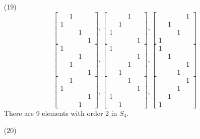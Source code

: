 \documentclass[12pt]{article}
\begin{document}
\begin{itemize}
\begin{itemize}
\end{itemize}
\item[(19)]
$$\begin{bmatrix}
& 1 \\
1 & \\
& & 1 \\
& & & 1
\end{bmatrix}, \begin{bmatrix}
& & 1 \\
& 1 \\
1 \\
& & & 1
\end{bmatrix}, \begin{bmatrix}
& & & 1 \\
& 1 \\
& & 1 \\
1
\end{bmatrix}$$
$$\begin{bmatrix}
1 \\
& & 1 \\
& 1 \\
& & & 1
\end{bmatrix}, \begin{bmatrix}
1 \\
& & & 1 \\
& & 1 \\
& 1
\end{bmatrix}, \begin{bmatrix}
1 \\
& 1 \\
& & & 1 \\
& & 1
\end{bmatrix}$$
$$\begin{bmatrix}
& 1 \\
1 \\
& & & 1 \\
& & 1
\end{bmatrix}, \begin{bmatrix}
& & 1 \\
& & & 1 \\
1 \\
& 1
\end{bmatrix}, \begin{bmatrix}
& & & 1 \\
& & 1 \\
& 1 \\
1
\end{bmatrix}$$
There are 9 elements with order 2 in $S_4$.
\item[(20)]
\begin{itemize}

\end{itemize}
\end{itemize}
\end{document}
